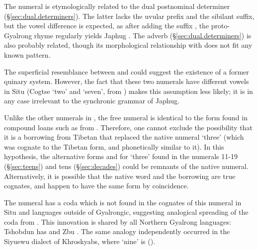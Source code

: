 The numeral  is etymologically related to the dual postnominal determiner  (§\ref{sec:dual.determiners}). The latter lacks the uvular prefix and the sibilant suffix, but the vowel difference is expected, as after adding the suffix , the proto-Gyalrong rhyme  regularly yields Japhug . The adverb  (§\ref{sec:dual.determiners}) is also probably related, though its morphological relationship with  does not fit any known pattern.

The superficial resemblance between  and  could suggest the existence of a former quinary system. However, the fact that these two numerals have different vowels in Situ (Cogtse  `two' and  `seven', from \citealt{huangsun02}) makes this assumption less likely; it is in any case irrelevant to the synchronic grammar of Japhug.

Unlike the other numerals in ,  the free numeral  is identical to the form found in compound loans such as   from . Therefore, one cannot exclude the possibility that it is a borrowing from Tibetan  that replaced the native numeral `three' (which was cognate to the Tibetan form, and phonetically similar to it). In this hypothesis, the alternative forms  and  for `three' found in the numerals 11-19 (§\ref{sec:teens}) and tens  (§\ref{sec:decades}) could be remnants of the native numeral. Alternatively, it is possible that the native word and the borrowing are true cognates, and happen to have the same form by coincidence.

The numeral  has a coda  which is not found in the cognates of this numeral in Situ and languages outside of Gyalrongic, suggesting analogical spreading of the coda from .
This innovation is shared by all Northern Gyalrong languages: Tshobdun has  \citep{jackson19tshobdun} and Zbu  \citep[130]{gong18these}. The same analogy independently occurred in the Siyuewu dialect of Khroskyabs, where  `nine' is  (\citealt[174]{lai17khroskyabs}).

